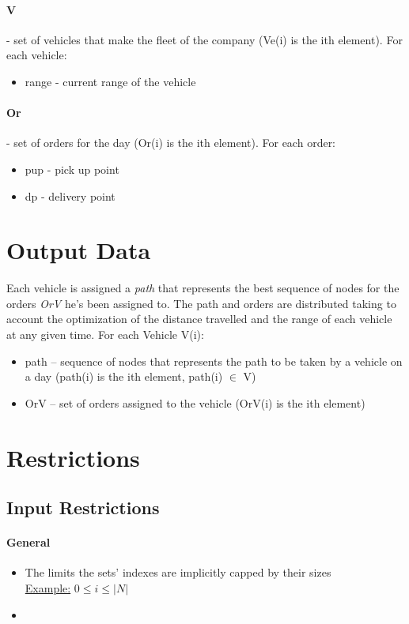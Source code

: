 \paragraph{V} - set of vehicles that make the fleet of the company (Ve(i) is the ith element). For each vehicle:
\begin{itemize}
	\item range - current range of the vehicle
\end{itemize}

\paragraph{Or} - set of orders for the day (Or(i) is the ith element). For each order:
\begin{itemize}
    \item pup - pick up point
	\item dp - delivery point
\end{itemize}


\section{Output Data}
Each vehicle is assigned a \textit{path} that represents the best sequence of nodes for the orders \textit{OrV} he's been assigned to. The path and orders are distributed taking to account the optimization of the distance travelled and the range of each vehicle at any given time.
For each Vehicle V(i):
\begin{itemize}
	\item path – sequence of nodes that represents the path to be taken by a vehicle on a day (path(i) is the ith element, path(i) $ \in $  V)
	\item OrV – set of orders assigned to the vehicle (OrV(i) is the ith element)
\end{itemize}


\section{Restrictions}


\subsection{Input Restrictions}
\paragraph{General}
\begin{itemize}
    \item The limits the sets' indexes are implicitly capped by their sizes\\ \uline{Example:}
    $ 0 \leq i \leq |N| $
    \item 
\end{itemize}
